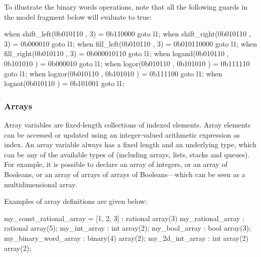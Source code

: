 \begin{example}
	To illustrate the binary words operations, note that all the following guards in the model fragment below will evaluate to true:

\begin{IMITATORmodel}
when shift_left(0b010110 , 3)     = 0b110000    goto l1;
when shift_right(0b010110 , 3)    = 0b000010    goto l1;
when fill_left(0b010110 , 3)      = 0b010110000 goto l1;
when fill_right(0b010110 , 3)     = 0b000010110 goto l1;
when logand(0b010110 , 0b101010 ) = 0b000010    goto l1;
when logor(0b010110 , 0b101010 )  = 0b111110    goto l1;
when logxor(0b010110 , 0b101010 ) = 0b111100    goto l1;
when lognot(0b010110 )            = 0b101001    goto l1;
\end{IMITATORmodel}

\end{example}


\subsubsection{Arrays}

Array variables are fixed-length collections of indexed elements.
Array elements can be accessed or updated using an integer-valued arithmetic expression as index.
An array variable always has a fixed length and an underlying type, which can be any of the available types of \imitator{} (including arrays, lists, stacks and queues).
For example, it is possible to declare an array of integers, or an array of Booleans, or an array of arrays of arrays of Booleans---which can be seen as a multidimensional array.

Examples of array definitions are given below:

\begin{IMITATORmodel}
	my_const_rational_array = [1, 2, 3] : rational array(3)
	my_rational_array    	: rational array(5);
	my_int_array         	: int array(2);
	my_bool_array        	: bool array(3);
	my_binary_word_array 	: binary(4) array(2);
	my_2d_int_array      	: int array(2) array(2);
\end{IMITATORmodel}

